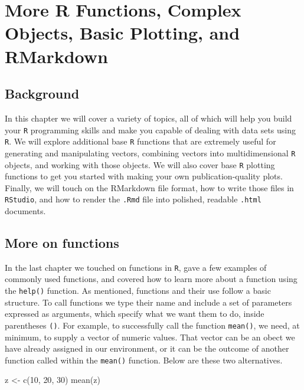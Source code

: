 \documentclass[
]{book}
\newenvironment{Shaded}{\begin{snugshade}}{\end{snugshade}}
\newcommand{\DecValTok}[1]{\textcolor[rgb]{0.00,0.00,0.81}{#1}}
\newcommand{\FunctionTok}[1]{\textcolor[rgb]{0.00,0.00,0.00}{#1}}
\newcommand{\NormalTok}[1]{#1}
\newcommand{\OtherTok}[1]{\textcolor[rgb]{0.56,0.35,0.01}{#1}}
\begin{document}
\hypertarget{more-r-functions-complex-objects-basic-plotting-and-rmarkdown}{%
\chapter{More R Functions, Complex Objects, Basic Plotting, and RMarkdown}\label{more-r-functions-complex-objects-basic-plotting-and-rmarkdown}}

\hypertarget{background-1}{%
\section{Background}\label{background-1}}

In this chapter we will cover a variety of topics, all of which will help you build your \texttt{R} programming skills and make you capable of dealing with data sets using \texttt{R}. We will explore additional base \texttt{R} functions that are extremely useful for generating and manipulating vectors, combining vectors into multidimensional \texttt{R} objects, and working with those objects. We will also cover base \texttt{R} plotting functions to get you started with making your own publication-quality plots. Finally, we will touch on the RMarkdown file format, how to write those files in \texttt{RStudio}, and how to render the \texttt{.Rmd} file into polished, readable \texttt{.html} documents.

\hypertarget{more-on-functions}{%
\section{More on functions}\label{more-on-functions}}

In the last chapter we touched on functions in \texttt{R}, gave a few examples of commonly used functions, and covered how to learn more about a function using the \texttt{help()} function. As mentioned, functions and their use follow a basic structure. To call functions we type their name and include a set of parameters expressed as arguments, which specify what we want them to do, inside parentheses \texttt{()}. For example, to successfully call the function \texttt{mean()}, we need, at minimum, to supply a vector of numeric values. That vector can be an obect we have already assigned in our environment, or it can be the outcome of another function called within the \texttt{mean()} function. Below are these two alternatives.

\begin{Shaded}
\begin{Highlighting}[]
\NormalTok{z }\OtherTok{\textless{}{-}} \FunctionTok{c}\NormalTok{(}\DecValTok{10}\NormalTok{, }\DecValTok{20}\NormalTok{, }\DecValTok{30}\NormalTok{)}
\FunctionTok{mean}\NormalTok{(z)}
\end{Highlighting}
\end{Shaded}
\end{document}
